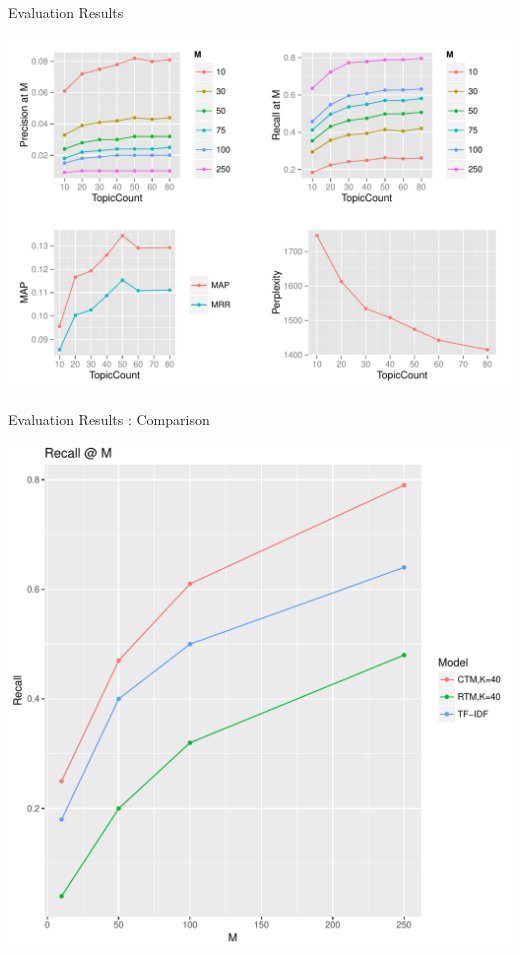 \documentclass[xcolor=dvipsnames]{beamer}
\begin{document}
\begin{frame}{Evaluation Results}
\begin{center}
    \includegraphics[scale=0.5]{RPlot.pdf}
\end{center}

\end{frame}

\begin{frame}{Evaluation Results : Comparison}

\begin{center}
    \includegraphics[scale=0.3]{comparison.pdf}
\end{center}

\end{frame}
\end{document}
